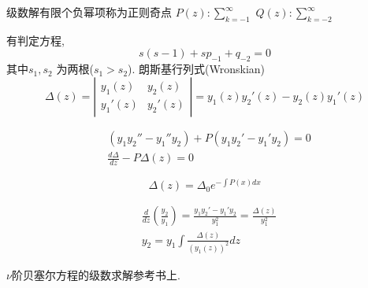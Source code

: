 级数解有限个负幂项称为正则奇点 $P(z): \sum_{k=-1}^{\infty}$
$Q(z) : \sum_{k=-2}^{\infty}$

有判定方程,
$$
s(s-1)+s p_{-1}+q_{-2}=0
$$
其中$s_1, s_2$ 为两根($s_1> s_2$).
朗斯基行列式(Wronskian)
$$
\Delta(z)=\left|\begin{array}{ll}
y_1(z) & y_2(z) \\
y_1'(z) & y_2'(z)
\end{array}\right|= y_1(z) y_2'(z) - y_2(z) y_1'(z)
$$

$$
\begin{aligned}
& \left(y_1 y_2''-y_1'' 
y_2\right)+P\left(y_1 y_2'-y_1' y_2\right) = 0\\
& \frac{d \Delta}{d z} - P \Delta(z)=0
\end{aligned}
$$

$$
\Delta(z)=\Delta_0 e^{-\int P(x) d x}
$$

$$
\begin{aligned}
& \frac{d}{d z}\left(\frac{y_{2}}{y_1}\right)=\frac{y_{1} y_{2}'-y_{1}' y_{2}}{y_{1}^2}=\frac{\Delta(z)}{y_{1}^2} \\
& y_{2}=y_{1} \int \frac{\Delta(z)}{\left(y_{1}(z)\right)^2} d z
\end{aligned}
$$

$\nu$阶贝塞尔方程的级数求解参考书上.